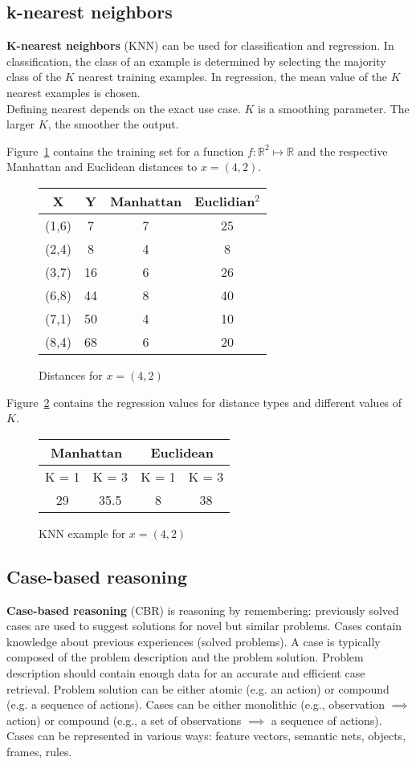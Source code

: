 \documentclass{report}
\begin{document}
\subsection{k-nearest neighbors}
{\bf K-nearest neighbors} (KNN) can be used for classification and regression.
In classification, the class of an example is determined by selecting the majority class of the $K$ nearest training examples.
In regression, the mean value of the $K$ nearest examples is chosen. \\
Defining nearest depends on the exact use case.
$K$ is a smoothing parameter. The larger $K$, the smoother the output.

Figure~\ref{figure:knnexample1} contains the training set for a function $f : \mathbb{R}^2 \mapsto \mathbb{R}$ and the respective Manhattan and Euclidean distances to $x=(4,2)$.
\begin{figure}[h!]
\centering
\begin{tabular}{c|c||c|c}
X & Y & Manhattan & Euclidian$^2$ \\
\hline
\hline
(1,6) & 7 & 7 & 25 \\
(2,4) & 8 & 4 & 8 \\
(3,7) & 16 & 6 & 26 \\
(6,8) & 44 & 8 & 40 \\
(7,1) & 50 & 4 & 10 \\
(8,4) & 68 & 6 & 20
\end{tabular}
\caption{Distances for $x=(4,2)$}
\label{figure:knnexample1}
\end{figure}

Figure~\ref{figure:knnexample2} contains the regression values for distance types and different values of $K$.

\begin{figure}[h!]
\centering
\begin{tabular}{c|c||c|c}
 \multicolumn{2}{c||}{Manhattan} & \multicolumn{2}{c}{Euclidean} \\
 \hline
 K = 1 & K = 3 & K = 1 & K = 3 \\
\hline
\hline
29 & 35.5 & 8 & 38 \\
\end{tabular}
\caption{KNN example for $x=(4,2)$}
\label{figure:knnexample2}
\end{figure}


\subsection{Case-based reasoning}
{\bf Case-based reasoning} (CBR) is reasoning by remembering: previously solved cases are used to suggest solutions for novel but similar problems. Cases contain knowledge about previous experiences (solved problems).
A case is typically composed of the problem description and the problem solution. Problem description should contain enough data for an accurate and efficient case retrieval.
Problem solution can be either atomic (e.g. an action) or compound (e.g. a sequence of actions). Cases can be either monolithic (e.g., observation $\implies$ action) or compound (e.g., a set of observations $\implies$ a sequence of actions).
Cases can be represented in various ways: feature vectors, semantic nets, objects, frames, rules.
\end{document}
